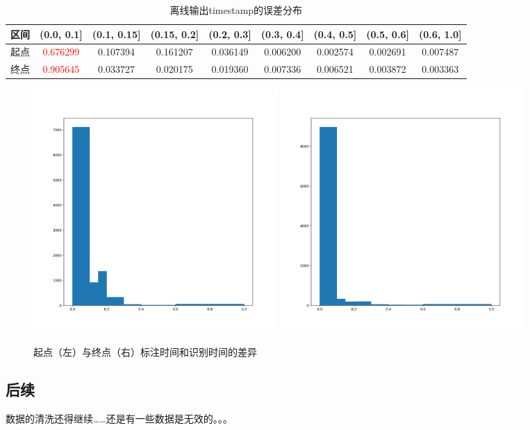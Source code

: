 \begin{table}[h]
 \centering
 \caption{离线输出timestamp的误差分布}
	 \begin{tabular*}{1\textwidth}{@{\extracolsep{\fill}}ccccccccc}
	 \toprule
		{\bf 区间} &(0.0, 0.1] &(0.1, 0.15]&(0.15, 0.2]&(0.2, 0.3] &(0.3, 0.4]&(0.4, 0.5]&(0.5, 0.6] &(0.6, 1.0] \\
	 \midrule
	 	起点 & \textcolor{red}{0.676299}& 0.107394& 0.161207& 0.036149 & 0.006200& 0.002574& 0.002691& 0.007487\\
	 	终点 & \textcolor{red}{0.905645}& 0.033727& 0.020175& 0.019360 & 0.007336& 0.006521& 0.003872& 0.003363\\
	 \bottomrule
	 \end{tabular*}%
 \label{tab:offline-dis}%
\end{table}%

\begin{figure}[!ht]
	\centering
	\includegraphics[width=0.45\textwidth]{figure/dis_start}
	\hspace{0cm}
	\includegraphics[width=0.45\textwidth]{figure/dis_end}
	\caption{起点（左）与终点（右）标注时间和识别时间的差异}
\label{fig:hist-dis}
\end{figure}

\subsection{后续}
数据的清洗还得继续……还是有一些数据是无效的。。。














